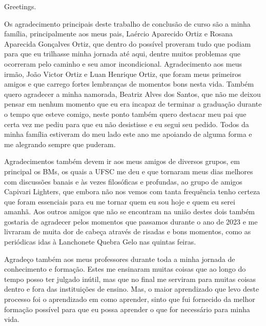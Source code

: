


\begin{agradecimentos}

\lang
{
    Greetings.
}
{
    Os agradecimento principais deste trabalho de conclusão de curso são a minha
    família, principalmente aos meus pais, Laércio Aparecido Ortiz e Rosana
    Aparecida Gonçalves Ortiz, que dentro do possível proveram tudo que podiam
    para que eu trilhasse minha jornada até aqui, dentre muitos problemas que
    ocorreram pelo caminho e seu amor incondicional. Agradecimento aos meus irmão,
    João Victor Ortiz e Luan Henrique Ortiz, que foram meus primeiros amigos e
    que carrego fortes lembranças de momentos bons nesta vida. Também quero agradecer
    a minha namorada, Beatriz Alves dos Santos, que não me deixou pensar em nenhum
    momento que eu era incapaz de terminar a graduação durante o tempo que esteve
    comigo, neste ponto também quero destacar meu pai que certa vez me pediu para que
    eu não desistisse e eu segui seu pedido. Todos da minha família estiveram do meu lado
    este ano me apoiando de alguma forma e me alegrando sempre que puderam.

	Agradecimentos também devem ir aos meus amigos de diversos grupos, em principal os BMs,
    os quais a UFSC me deu e que tornaram meus dias melhores com discussões banais e às
    vezes filosóficas e profundas, ao grupo de amigos Capivari Lighters, que embora não
    nos vemos com tanta frequência tenho certeza que foram essenciais para eu me tornar
    quem eu sou hoje e quem eu serei amanhã. Aos outros amigos que não se encontram na
    união destes dois também gostaria de agradecer pelos momentos que passamos durante o
    ano de 2023 e me livraram de muita dor de cabeça através de risadas e bons momentos,
    como as periódicas idas à Lanchonete Quebra Gelo nas quintas feiras.
	
	Agradeço também aos meus professores durante toda a minha jornada de conhecimento 
	e formação. Estes me ensinaram muitas coisas que ao longo do tempo posso ter julgado
	inútil, mas que no final me serviram para muitas coisas dentro e fora das instituições
	de ensino. Mas, o maior aprendizado que levo deste processo foi o aprendizado em 
    como aprender, sinto que fui fornecido da melhor formação possível para que eu possa
    aprender o que for necessário para minha vida.
}
\end{agradecimentos}
